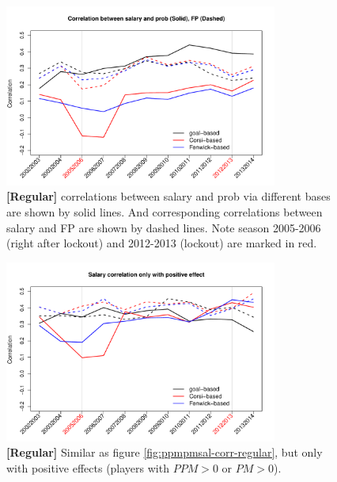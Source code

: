 \begin{figure}[htb!]
	\centering
	\includegraphics[width=0.8\textwidth]{figures/probfpsal-corr-regular.pdf}
	\caption{\textbf{[Regular]} correlations between salary and prob via different bases are shown by solid lines. And corresponding correlations between salary and FP are shown by dashed lines. Note season 2005-2006 (right after lockout) and 2012-2013 (lockout) are marked in red. }\label{fig:probfpsal-corr-regular}
\end{figure}

\begin{figure}[htb!]
	\centering
	\includegraphics[width=0.8\textwidth]{figures/pos-ppmpmsal-corr-regular.pdf}
	\caption{\textbf{[Regular]} Similar as figure \ref{fig:ppmpmsal-corr-regular}, but only with positive effects (players with $PPM>0$ or $PM>0$). }\label{fig:pos-ppmpmsal-corr-regular}
\end{figure}

